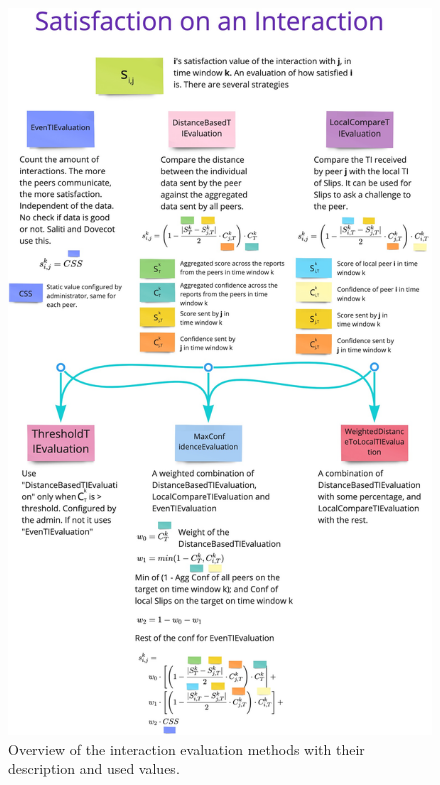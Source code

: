 \begin{figure}
    \centering
    \includegraphics[height=0.95\textheight]{assets/interaction_evaluation.jpeg}
    \caption{Overview of the interaction evaluation methods with their description and used values.}
    \label{fig:overview-of-interaction-evaluation-methods}
\end{figure}